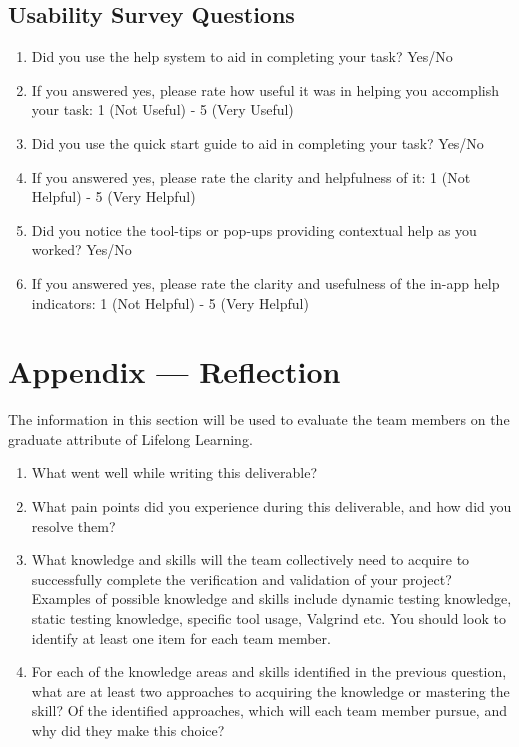 \documentclass[12pt, titlepage]{article}
\begin{document}
\subsection{Usability Survey Questions}
\begin{enumerate}
  \item Did you use the help system to aid in completing your task? Yes/No
  \item If you answered yes, please rate how useful it was in helping you accomplish your task: 1 (Not Useful) - 5 (Very Useful)
  \item Did you use the quick start guide to aid in completing your task? Yes/No
  \item If you answered yes, please rate the clarity and helpfulness of it: 1 (Not Helpful) - 5 (Very Helpful)
  \item Did you notice the tool-tips or pop-ups providing contextual help as you worked? Yes/No
  \item If you answered yes, please rate the clarity and usefulness of the in-app help indicators: 1 (Not Helpful) - 5 (Very Helpful)
  
\end{enumerate}

\newpage{}
\section*{Appendix --- Reflection}


The information in this section will be used to evaluate the team members on the
graduate attribute of Lifelong Learning.



\begin{enumerate}
  \item What went well while writing this deliverable? 
  \item What pain points did you experience during this deliverable, and how
    did you resolve them?
  \item What knowledge and skills will the team collectively need to acquire to
  successfully complete the verification and validation of your project?
  Examples of possible knowledge and skills include dynamic testing knowledge,
  static testing knowledge, specific tool usage, Valgrind etc.  You should look to
  identify at least one item for each team member.
  \item For each of the knowledge areas and skills identified in the previous
  question, what are at least two approaches to acquiring the knowledge or
  mastering the skill?  Of the identified approaches, which will each team
  member pursue, and why did they make this choice?
\end{enumerate}
\end{document}

